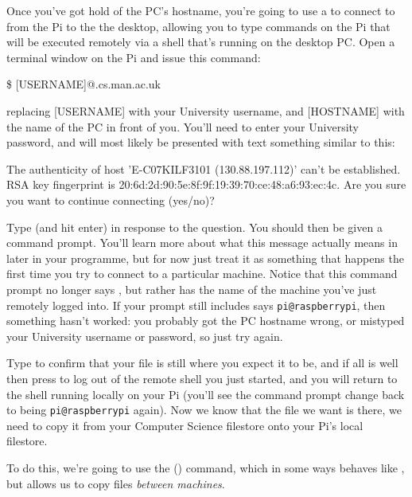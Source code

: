 Once you've got hold of the PC's hostname, you're going to use a  to connect to from the Pi to the the desktop, allowing you to type commands on the Pi that will be executed remotely via a shell that's running on the desktop PC. Open a terminal window on the Pi and issue this command:

\begin{ttoutenv}
\$  [USERNAME]\!@\![HOSTNAME].cs.man.ac.uk
\end{ttoutenv}

replacing [USERNAME] with your University username, and [HOSTNAME] with the name of the PC in front of you. You'll need to enter your University password, and will most likely be presented with text something similar to this:

\begin{ttoutenv}
The authenticity of host 'E-C07KILF3101 (130.88.197.112)' can't be established.
RSA key fingerprint is 20:6d:2d:90:5e:8f:9f:19:39:70:ce:48:a6:93:ec:4c.
Are you sure you want to continue connecting (yes/no)? 
\end{ttoutenv}

Type  (and hit enter) in response to the question. You should then be given a command prompt. You'll learn more about what this message actually means in later in your programme, but for now just treat it as something that happens the first time you try to connect to a particular machine. Notice that this command prompt no longer says , but rather has the name of the machine you've just remotely logged into. If your prompt still includes says \texttt{pi@raspberrypi}, then something hasn't worked: you probably got the PC hostname wrong, or mistyped your University username or password, so just try again.   

Type  to confirm that your  file is still where you expect it to be, and if all is well then press  to log out of the remote shell you just started, and you will return to the shell running locally on your Pi (you'll see the command prompt change back to being \texttt{pi@raspberrypi} again). Now we know that the file we want is there, we need to copy it from your Computer Science filestore onto your Pi's local filestore.

To do this, we're going to use the  () command, which in some ways behaves like , but allows us to copy files \textit{between machines}. 

